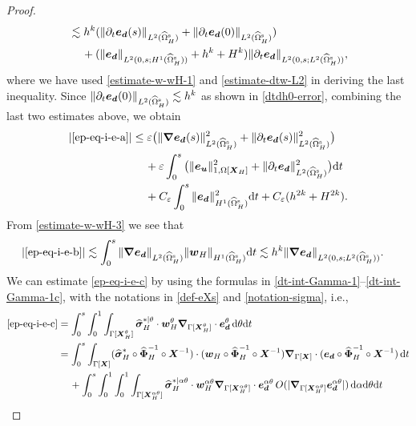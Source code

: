 \documentclass[11pt,reqno]{amsart}
\theoremstyle{definition}
\theoremstyle{plain}
\numberwithin{theorem}{section}
\numberwithin{proposition}{section}
\numberwithin{lemma}{section}
\numberwithin{equation}{section}
\newcommand{\bs}[1]{\boldsymbol{#1}}
\newcommand{\uu}[1]  {{\bs{#1}} }
\newcommand{\dep}{{{\bs{d}}}}
\newcommand{\grad}   { \uu{\nabla}    }
\def\d{\mathrm{d}}
\newcommand{\bw}{{\bs w}}
\renewcommand{\(}{\bigl(}
\renewcommand{\)}{\bigr)}
\begin{document}
\begin{proof}
\begin{align}
&\lesssim h^k (\|\partial_t {\bs e}_{\dep}(s) \|_{L^2(\widehat{\Omega}^{\rm s}_H)} 
+\|\partial_t{\bs e}_{\dep}(0) \|_{L^2(\widehat{\Omega}^{\rm s}_H)} ) \notag\\
&\quad\, + (\|{\bs e}_{\bs d}\|_{L^2(0,s;H^1(\widehat\Omega^{\rm s}_H))} 
+ h^k + H^k)\|\partial_t {\bs e}_{\dep}\|_{L^2(0,s;L^2(\widehat{\Omega}^{\rm s}_H))} , \notag
\end{align}
where we have used \eqref{estimate-w-wH-1} and \eqref{estimate-dtw-L2} in deriving the last inequality. Since $\|\partial_t{\bs e}_{\dep}(0)\|_{L^2(\widehat\Omega_H^{\rm s})}\lesssim h^k$ as shown in \eqref{dtdh0-error}, combining the last two estimates above, we obtain 
\begin{align}
|\eqref{ep-eq-i-e-a}|
&\le \varepsilon \big( \|\grad{\bs e}_{\bs d}(s)\|_{L^2(\widehat\Omega^{\rm s}_H)}^2 + \|\partial_t{\bs e}_{\bs d}(s)\|_{L^2(\widehat\Omega^{\rm s}_H)}^2 \big) \notag\\
&\quad\, 
+  \varepsilon\int_0^s \big(\| {\bs e}_{\bs u}  \|_{1,\Omega[{\bs X}_H]}^2 + \|\partial_t{\bs e}_\dep\|_{L^2(\widehat{\Omega}^{\rm s}_H)}^2 \big) \d t\notag\\
&\quad\,
+ C_\varepsilon \int_0^s \|{\bs e}_\dep\|_{H^1(\widehat{\Omega}^{\rm s}_H)}^2 \d t 
+ C_\varepsilon(h^{2k} + H^{2k}) . 
\end{align}
From \eqref{estimate-w-wH-3} we see that
\begin{align}
|\eqref{ep-eq-i-e-b}|
&\lesssim \int_0^s \|\grad{\bs e}_{\bs d}\|_{L^2(\widehat{\Omega}_H^{\rm s})} \|{\bs w}_H\|_{H^1(\widehat{\Omega}_H^{\rm s})} \d t
\lesssim h^{k} \|\grad{\bs e}_{\bs d}\|_{L^2(0,s;L^2(\widehat{\Omega}_H^{\rm s}))}  .
\end{align}
We can estimate \eqref{ep-eq-i-e-c} by using the formulas in \eqref{dt-int-Gamma-1}--\eqref{dt-int-Gamma-1c}, with the notations in \eqref{def-eXs} and \eqref{notation-sigma}, i.e.,
\begin{align}
\eqref{ep-eq-i-e-c} 
&= \int_0^s \int_0^1 \int_{\Gamma[\bs X_H^\theta]} {\widehat{\bs\sigma} }_H^{*|\theta}\cdot \bw_H^\theta \grad_{\Gamma[\bs X_H^\theta]}\cdot {\bs e}_{\bs d}^\theta \,\d\theta \d t \notag\\
&=  \int_0^s  \int_{\Gamma[\bs X]} ({\widehat{\bs \sigma} }_H^*\circ\widehat{\bs\Phi}_H^{-1}\circ{\bs X}^{-1})\cdot (\bw_H\circ\widehat{\bs\Phi}_H^{-1}\circ{\bs X}^{-1}) \grad_{\Gamma[\bs X]}\cdot ({\bs e}_{\bs d}\circ\widehat{\bs\Phi}_H^{-1}\circ{\bs X}^{-1}) \, \d t \notag\\
&\quad\, + \int_0^s \int_0^1\int_0^1 \int_{\Gamma[\bs X_H^{\alpha\theta}]} {\widehat{\bs \sigma} }_H^{*|\alpha\theta}\cdot \bw_H^{\alpha\theta} \grad_{\Gamma[\bs X_H^{\alpha\theta}]}\cdot {\bs e}_{\bs d}^{\alpha\theta}\, O(|\grad_{\Gamma[\bs X_H^{\alpha\theta}]} {\bs e}_{\bs d}^{\alpha\theta}|)\,\d\alpha\d\theta \d t \notag\\

\end{align}
\end{proof}
\end{document}
